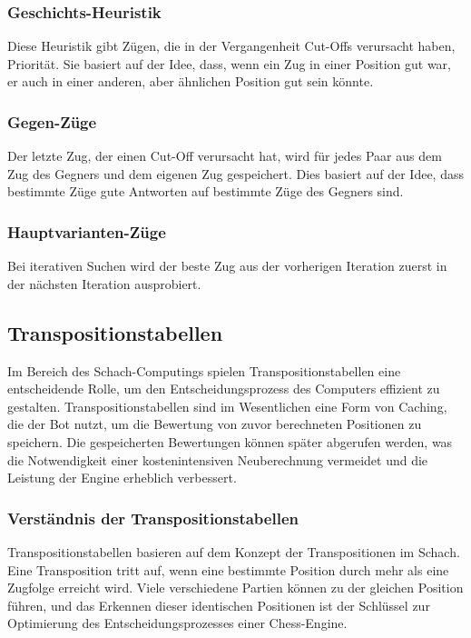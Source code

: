 \subsubsection{Geschichts-Heuristik}
Diese Heuristik gibt Zügen, die in der Vergangenheit Cut-Offs verursacht haben, Priorität.
Sie basiert auf der Idee, dass, wenn ein Zug in einer Position gut war, er auch in einer anderen, aber ähnlichen Position gut sein könnte.~\cite{Move_Ordering_2023_chessprogramming}

\subsubsection{Gegen-Züge}
Der letzte Zug, der einen Cut-Off verursacht hat, wird für jedes Paar aus dem Zug des Gegners und dem eigenen Zug gespeichert.
Dies basiert auf der Idee, dass bestimmte Züge gute Antworten auf bestimmte Züge des Gegners sind.~\cite{Move_Ordering_2023_chessprogramming}

\subsubsection{Hauptvarianten-Züge}
Bei iterativen Suchen wird der beste Zug aus der vorherigen Iteration zuerst in der nächsten Iteration ausprobiert.~\cite{Move_Ordering_2023_chessprogramming}

\subsection{Transpositionstabellen}
Im Bereich des Schach-Computings spielen Transpositionstabellen eine entscheidende Rolle, um den Entscheidungsprozess des Computers effizient zu gestalten. 
Transpositionstabellen sind im Wesentlichen eine Form von Caching, die der Bot nutzt, um die Bewertung von zuvor berechneten Positionen zu speichern. 
Die gespeicherten Bewertungen können später abgerufen werden, was die Notwendigkeit einer kostenintensiven Neuberechnung vermeidet 
und die Leistung der Engine erheblich verbessert.~\cite{Jos_W._H_1970_researchgate}

\subsubsection{Verständnis der Transpositionstabellen}
Transpositionstabellen basieren auf dem Konzept der Transpositionen im Schach. 
Eine Transposition tritt auf, wenn eine bestimmte Position durch mehr als eine Zugfolge erreicht wird. 
Viele verschiedene Partien können zu der gleichen Position führen, und das Erkennen dieser identischen Positionen ist der 
Schlüssel zur Optimierung des Entscheidungsprozesses einer Chess-Engine.~\cite{Jos_W._H_1970_researchgate}

